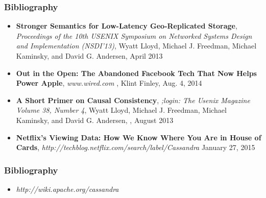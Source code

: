 \documentclass{beamer}
\begin{document}
\begin{frame}
\frametitle{Bibliography}


\begin{itemize}
\item \textbf{Stronger Semantics for Low-Latency Geo-Replicated Storage}, 
\textit{Proceedings of the 10th USENIX Symposium on Networked Systems Design and Implementation (NSDI’13)}, 
Wyatt Lloyd, Michael J. Freedman, Michael Kaminsky, and David G. Andersen, 
April 2013

\item \textbf{Out in the Open: The Abandoned Facebook Tech That Now Helps Power Apple}, 
\textit{www.wired.com}
, Klint Finley, Aug. 4, 2014

\item \textbf{A Short Primer on Causal Consistency}, 
\textit{;login: The Usenix Magazine Volume 38, Number 4}, 
Wyatt Lloyd, Michael J. Freedman, Michael Kaminsky, and David G. Andersen, , August 2013

\item \textbf{Netflix's Viewing Data: How We Know Where You Are in House of Cards},
\textit{http://techblog.netflix.com/search/label/Cassandra}
January 27, 2015



\end{itemize}  
\end{frame}


\begin{frame}
\frametitle{Bibliography}

\begin{itemize}
\item \textit{http://wiki.apache.org/cassandra}

\end{itemize}  
\end{frame}
\end{document}
